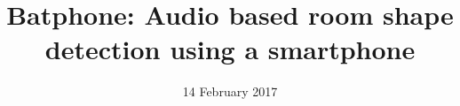 \documentclass{sig-alternate-10pt}
\begin{document}

\title{Batphone: Audio based room shape detection using a smartphone}
%
\date{14 February 2017}
\maketitle



%
%








%


%


%


\end{document}
